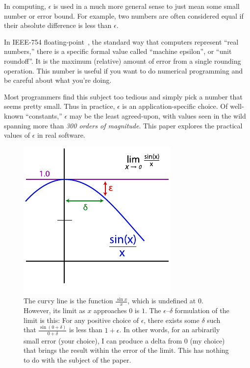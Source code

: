 \documentclass[twocolumn]{article}
\begin{document}
In computing, $\epsilon$ is used in a much more general sense to just
mean some small number or error bound. For example, two numbers are
often considered equal if their absolute difference is less than
$\epsilon$.

In IEEE-754 floating-point~\cite{ieee754}, the standard way that
computers represent ``real numbers,'' there is a specific formal value
called ``machine epsilon'', or ``unit roundoff''. It is the maximum
(relative) amount of error from a single rounding operation. This
number is useful if you want to do numerical programming and be
careful about what you're doing.

Most programmers find this subject too tedious and simply pick a
number that seems pretty small. Thus in practice, $\epsilon$ is an
application-specific choice. Of well-known ``constants,'' $\epsilon$
may be the least agreed-upon, with values seen in the wild spanning
more than {\em 300 orders of magnitude}. This paper explores the
practical values of $\epsilon$ in real software.

\begin{figure}[ht]
\begin{center}
\includegraphics[width=0.90 \linewidth]{epsilondelta.pdf}
\end{center}\vspace{-0.1in}
\caption{ The curvy line is the function $\frac{\sin x}{x}$, which is
  undefined at $0$. However, its limit as $x$ approaches $0$ is $1$.
  The $\epsilon$--$\delta$ formulation of the limit is this: For any
  positive choice of $\epsilon$, there exists some $\delta$ such that
  $\frac{\sin (0 + \delta)}{0 + \delta}$ is less than $1 + \epsilon$.
  In other words, for an arbirarily small error (your choice), I
  can produce a delta from $0$ (my choice) that brings the result
  within the error of the limit. This has nothing to do with the
  subject of the paper.}
\label{fig:epsilondelta}
\end{figure}
\end{document}
